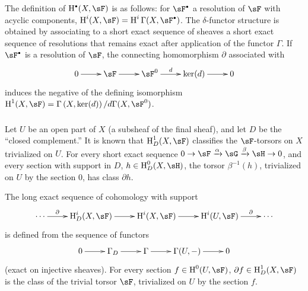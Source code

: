 \subsubsection{}\label{IV:1-1-3}

The definition of $\h^\bullet(X,\sF)$ is as follows: for $\sF^\bullet$ a
resolution of $\sF$ with acyclic components,
$\h^i(X,\sF) = \h^i\Gamma(X,\sF^\bullet)$. The $\delta$-functor structure is
obtained by associating to a short exact sequence of sheaves a short exact
sequence of resolutions that remains exact after application of the functor
$\Gamma$. If $\sF^\bullet$ is a resolution of $\sF$, the connecting
homomorphism $\partial$ associated with
\[\xymatrix{
  0 \ar[r]
    & \sF \ar[r]
    & \sF^0 \ar[r]^-d
    & \ker(d) \ar[r]
    & 0
}\]
induces the negative of the defining isomorphism
$\h^1(X,\sF) = \Gamma\left(X,\ker(d)\right)/d \Gamma(X,\sF^0)$.






\subsubsection{}\label{IV:1-1-4}

Let $U$ be an open part of $X$ (a subsheaf of the final sheaf), and let $D$
be the ``closed complement.'' It is known that $\h_D^1(X,\sF)$ classifies
the $\sF$-torsors on $X$ trivialized on $U$. For every short exact sequence
$0\to \sF\xrightarrow\alpha \sG\xrightarrow\beta\sH\to 0$, and every
section with support in $D$, $h\in\h_D^0(X,\sH)$, the torsor
$\beta^{-1}(h)$, trivialized on $U$ by the section $0$, has class
$\partial h$.

The long exact sequence of cohomology with support
\[\xymatrix{
  \cdots \ar[r]^-\partial
    & \h_D^i(X,\sF) \ar[r]
    & \h^i(X,\sF) \ar[r]
    & \h^i(U,\sF) \ar[r]^-\partial
    & \cdots
}\]
is defined from the sequence of functors
\[\xymatrix{
  0 \ar[r]
    & \Gamma_D \ar[r]
    & \Gamma \ar[r]
    & \Gamma(U,-) \ar[r]
    & 0
}\]
(exact on injective sheaves). For every section $f\in \h^0(U,\sF)$,
$\partial f\in \h_D^1(X,\sF)$ is the class of the trivial torsor $\sF$,
trivialized on $U$ by the section $f$.






\subsubsection{}\label{IV:1-1-5}

